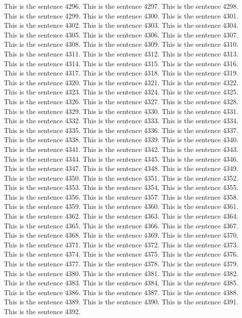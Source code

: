 \documentclass{article}
\begin{document}
This is the sentence 4296.
This is the sentence 4297.
This is the sentence 4298.
This is the sentence 4299.
This is the sentence 4300.
This is the sentence 4301.
This is the sentence 4302.
This is the sentence 4303.
This is the sentence 4304.
This is the sentence 4305.
This is the sentence 4306.
This is the sentence 4307.
This is the sentence 4308.
This is the sentence 4309.
This is the sentence 4310.
This is the sentence 4311.
This is the sentence 4312.
This is the sentence 4313.
This is the sentence 4314.
This is the sentence 4315.
This is the sentence 4316.
This is the sentence 4317.
This is the sentence 4318.
This is the sentence 4319.
This is the sentence 4320.
This is the sentence 4321.
This is the sentence 4322.
This is the sentence 4323.
This is the sentence 4324.
This is the sentence 4325.
This is the sentence 4326.
This is the sentence 4327.
This is the sentence 4328.
This is the sentence 4329.
This is the sentence 4330.
This is the sentence 4331.
This is the sentence 4332.
This is the sentence 4333.
This is the sentence 4334.
This is the sentence 4335.
This is the sentence 4336.
This is the sentence 4337.
This is the sentence 4338.
This is the sentence 4339.
This is the sentence 4340.
This is the sentence 4341.
This is the sentence 4342.
This is the sentence 4343.
This is the sentence 4344.
This is the sentence 4345.
This is the sentence 4346.
This is the sentence 4347.
This is the sentence 4348.
This is the sentence 4349.
This is the sentence 4350.
This is the sentence 4351.
This is the sentence 4352.
This is the sentence 4353.
This is the sentence 4354.
This is the sentence 4355.
This is the sentence 4356.
This is the sentence 4357.
This is the sentence 4358.
This is the sentence 4359.
This is the sentence 4360.
This is the sentence 4361.
This is the sentence 4362.
This is the sentence 4363.
This is the sentence 4364.
This is the sentence 4365.
This is the sentence 4366.
This is the sentence 4367.
This is the sentence 4368.
This is the sentence 4369.
This is the sentence 4370.
This is the sentence 4371.
This is the sentence 4372.
This is the sentence 4373.
This is the sentence 4374.
This is the sentence 4375.
This is the sentence 4376.
This is the sentence 4377.
This is the sentence 4378.
This is the sentence 4379.
This is the sentence 4380.
This is the sentence 4381.
This is the sentence 4382.
This is the sentence 4383.
This is the sentence 4384.
This is the sentence 4385.
This is the sentence 4386.
This is the sentence 4387.
This is the sentence 4388.
This is the sentence 4389.
This is the sentence 4390.
This is the sentence 4391.
This is the sentence 4392.
\end{document}
